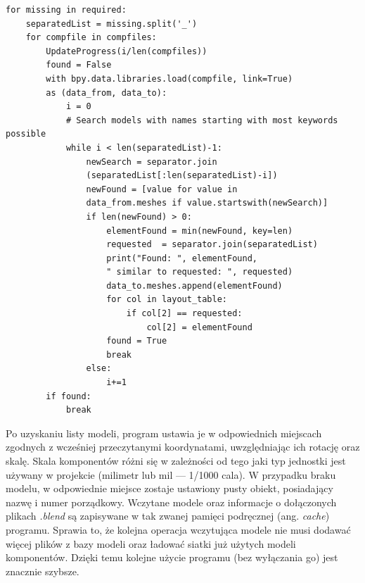 \documentclass{xmgr}
\begin{document}
\begin{lstlisting}
for missing in required:
    separatedList = missing.split('_')
    for compfile in compfiles:
        UpdateProgress(i/len(compfiles))
        found = False
        with bpy.data.libraries.load(compfile, link=True)
        as (data_from, data_to):
            i = 0
            # Search models with names starting with most keywords possible
            while i < len(separatedList)-1:
                newSearch = separator.join
                (separatedList[:len(separatedList)-i])
                newFound = [value for value in
                data_from.meshes if value.startswith(newSearch)]
                if len(newFound) > 0:
                    elementFound = min(newFound, key=len)
                    requested  = separator.join(separatedList)
                    print("Found: ", elementFound,
                    " similar to requested: ", requested)
                    data_to.meshes.append(elementFound)
                    for col in layout_table:
                        if col[2] == requested:
                            col[2] = elementFound
                    found = True
                    break
                else:
                    i+=1
        if found:
            break
\end{lstlisting}
Po uzyskaniu listy modeli, program ustawia je w odpowiednich miejscach zgodnych z wcześniej przeczytanymi koordynatami, uwzględniając ich rotację oraz skalę. Skala komponentów różni się w zależności od tego jaki typ jednostki jest używany w projekcie (milimetr lub mil --- 1/1000 cala). W przypadku braku modelu, w odpowiednie miejsce zostaje ustawiony pusty obiekt, posiadający nazwę i numer porządkowy.
Wczytane modele oraz informacje o dołączonych plikach \emph{.blend} są zapisywane w tak zwanej pamięci podręcznej (ang. \emph{cache}) programu. Sprawia to, że kolejna operacja wczytująca modele nie musi dodawać więcej plików z bazy modeli oraz ładować siatki już użytych modeli komponentów. Dzięki temu kolejne użycie programu (bez wyłączania go) jest znacznie szybsze.
\end{document}
